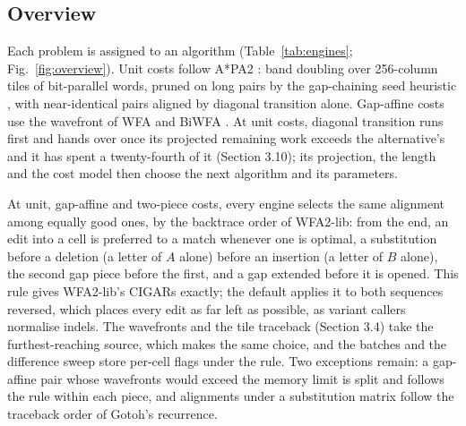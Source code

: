 \documentclass[nocrop,noinfo]{bioinfo}
\begin{document}
\subsection{Overview}

Each problem is assigned to an algorithm (Table~\ref{tab:engines}; Fig.~\ref{fig:overview}). Unit costs follow A*PA2 \citep{GrootKoerkamp2024astarpa2}: band doubling over 256-column tiles of bit-parallel words, pruned on long pairs by the gap-chaining seed heuristic \citep{GrootKoerkamp2024astarpa}, with near-identical pairs aligned by diagonal transition alone. Gap-affine costs use the wavefront of WFA and BiWFA \citep{MarcoSola2021wfa,MarcoSola2023biwfa}. At unit costs, diagonal transition runs first and hands over once its projected remaining work exceeds the alternative's and it has spent a twenty-fourth of it (Section 3.10); its projection, the length and the cost model then choose the next algorithm and its parameters.

At unit, gap-affine and two-piece costs, every engine selects the same alignment among equally good ones, by the backtrace order of WFA2-lib: from the end, an edit into a cell is preferred to a match whenever one is optimal, a substitution before a deletion (a letter of \(A\) alone) before an insertion (a letter of \(B\) alone), the second gap piece before the first, and a gap extended before it is opened. This rule gives WFA2-lib's CIGARs exactly; the default applies it to both sequences reversed, which places every edit as far left as possible, as variant callers normalise indels. The wavefronts and the tile traceback (Section 3.4) take the furthest-reaching source, which makes the same choice, and the batches and the difference sweep store per-cell flags under the rule. Two exceptions remain: a gap-affine pair whose wavefronts would exceed the memory limit is split and follows the rule within each piece, and alignments under a substitution matrix follow the traceback order of Gotoh's recurrence.
\end{document}
